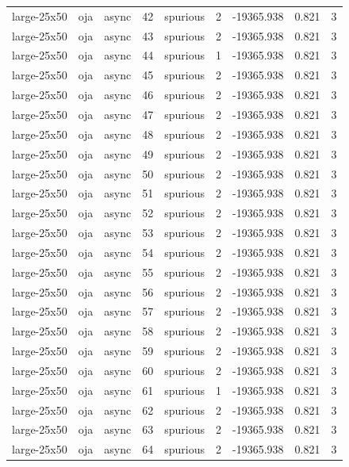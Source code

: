 \begin{tabular}{lllrlrrrr}
large-25x50 & oja & async & 42 & spurious & 2 & -19365.938 & 0.821 & 3 \\
large-25x50 & oja & async & 43 & spurious & 2 & -19365.938 & 0.821 & 3 \\
large-25x50 & oja & async & 44 & spurious & 1 & -19365.938 & 0.821 & 3 \\
large-25x50 & oja & async & 45 & spurious & 2 & -19365.938 & 0.821 & 3 \\
large-25x50 & oja & async & 46 & spurious & 2 & -19365.938 & 0.821 & 3 \\
large-25x50 & oja & async & 47 & spurious & 2 & -19365.938 & 0.821 & 3 \\
large-25x50 & oja & async & 48 & spurious & 2 & -19365.938 & 0.821 & 3 \\
large-25x50 & oja & async & 49 & spurious & 2 & -19365.938 & 0.821 & 3 \\
large-25x50 & oja & async & 50 & spurious & 2 & -19365.938 & 0.821 & 3 \\
large-25x50 & oja & async & 51 & spurious & 2 & -19365.938 & 0.821 & 3 \\
large-25x50 & oja & async & 52 & spurious & 2 & -19365.938 & 0.821 & 3 \\
large-25x50 & oja & async & 53 & spurious & 2 & -19365.938 & 0.821 & 3 \\
large-25x50 & oja & async & 54 & spurious & 2 & -19365.938 & 0.821 & 3 \\
large-25x50 & oja & async & 55 & spurious & 2 & -19365.938 & 0.821 & 3 \\
large-25x50 & oja & async & 56 & spurious & 2 & -19365.938 & 0.821 & 3 \\
large-25x50 & oja & async & 57 & spurious & 2 & -19365.938 & 0.821 & 3 \\
large-25x50 & oja & async & 58 & spurious & 2 & -19365.938 & 0.821 & 3 \\
large-25x50 & oja & async & 59 & spurious & 2 & -19365.938 & 0.821 & 3 \\
large-25x50 & oja & async & 60 & spurious & 2 & -19365.938 & 0.821 & 3 \\
large-25x50 & oja & async & 61 & spurious & 1 & -19365.938 & 0.821 & 3 \\
large-25x50 & oja & async & 62 & spurious & 2 & -19365.938 & 0.821 & 3 \\
large-25x50 & oja & async & 63 & spurious & 2 & -19365.938 & 0.821 & 3 \\
large-25x50 & oja & async & 64 & spurious & 2 & -19365.938 & 0.821 & 3 \\

\end{tabular}
